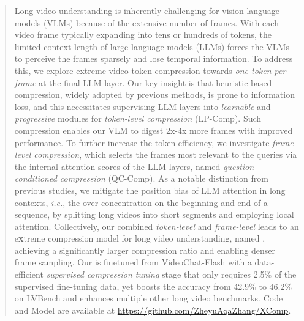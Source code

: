 \begin{abstract}
Long video understanding is inherently challenging for vision-language models (VLMs) because of the extensive number of frames. With each video frame typically expanding into tens or hundreds of tokens, the limited context length of large language models (LLMs) forces the VLMs to perceive the frames sparsely and lose temporal information. To address this, we explore extreme video token compression towards \emph{one token per frame} at the final LLM layer. Our key insight is that heuristic-based compression, widely adopted by previous methods, is prone to information loss, and this necessitates supervising LLM layers into \emph{learnable} and \emph{progressive} modules for \emph{token-level compression} (LP-Comp). Such compression enables our VLM to digest 2x-4x more frames with improved performance. To further increase the token efficiency, we investigate \emph{frame-level compression}, which selects the frames most relevant to the queries via the internal attention scores of the LLM layers, named \emph{question-conditioned compression} (QC-Comp). As a notable distinction from previous studies, we mitigate the position bias of LLM attention in long contexts, \emph{i.e.}, the over-concentration on the beginning and end of a sequence, by splitting long videos into short segments and employing local attention. Collectively, our combined \emph{token-level} and \emph{frame-level} leads to an e\textbf{x}treme compression model for long video understanding, named \textbf{\name}, achieving a significantly larger compression ratio and enabling denser frame sampling. Our \name is finetuned from VideoChat-Flash with a data-efficient \emph{supervised compression tuning} stage that only requires 2.5\% of the supervised fine-tuning data, yet boosts the accuracy from 42.9\% to 46.2\% on LVBench and enhances multiple other long video benchmarks. Code and Model are available at \url{https://github.com/ZheyuAqaZhang/XComp}.


\end{abstract}

